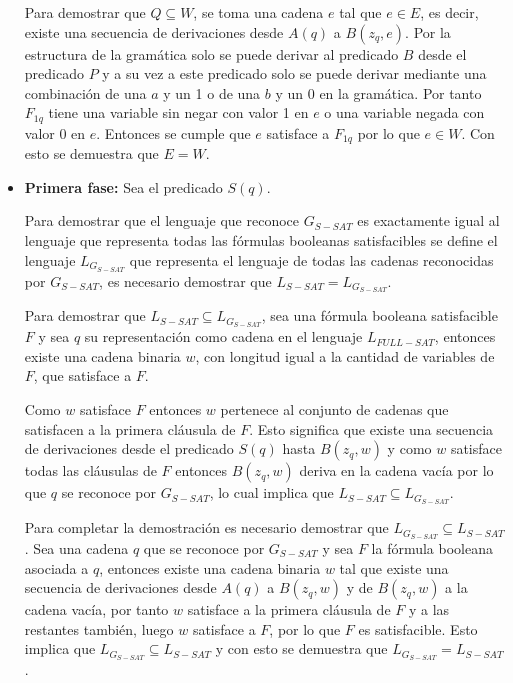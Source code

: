 \begin{itemize}
          Para demostrar que $Q\subseteq W$, se toma una cadena $e$ tal que $e\in E$, es decir, existe una
          secuencia de derivaciones desde $A(q)$ a $B(z_q,e)$. Por la estructura de la gramática solo se
          puede derivar al predicado $B$ desde el predicado $P$ y a su vez a este predicado solo se puede
          derivar mediante una combinación de una $a$ y un 1 o de una $b$ y un 0 en la gramática. Por tanto
          $F_{1q}$ tiene una variable sin negar con valor 1 en $e$ o una variable negada con valor 0 en $e$.
          Entonces se cumple que $e$ satisface a $F_{1q}$ por lo que $e\in W$. Con esto se demuestra que $E=W$.

    \item \textbf{Primera fase:} Sea el predicado $S(q)$.

          Para demostrar que el lenguaje que reconoce $G_{S-SAT}$ es exactamente igual al lenguaje que
          representa todas las fórmulas booleanas satisfacibles se define el lenguaje $L_{G_{S-SAT}}$
          que representa el lenguaje de todas las cadenas reconocidas por $G_{S-SAT}$, es necesario
          demostrar que $L_{S-SAT}=L_{G_{S-SAT}}$.

          Para demostrar que $L_{S-SAT}\subseteq L_{G_{S-SAT}}$, sea una fórmula booleana satisfacible $F$ y sea $q$ su representación como cadena en el lenguaje $L_{FULL-SAT}$,
          entonces existe una cadena binaria $w$, con longitud igual a la cantidad de variables de $F$, que satisface
          a $F$.

          Como $w$ satisface $F$ entonces $w$ pertenece al conjunto de cadenas que satisfacen a la primera
          cláusula de $F$. Esto significa que existe una secuencia de derivaciones desde el predicado $S(q)$
          hasta $B(z_q,w)$ y como $w$ satisface todas las cláusulas de $F$ entonces $B(z_q,w)$ deriva en la
          cadena vacía por lo que $q$ se reconoce por $G_{S-SAT}$, lo cual implica que $L_{S-SAT}\subseteq L_{G_{S-SAT}}$.

          Para completar la demostración es necesario demostrar que $ L_{G_{S-SAT}}\subseteq L_{S-SAT}$. Sea una cadena
          $q$ que se reconoce por $G_{S-SAT}$ y sea $F$ la fórmula booleana asociada a $q$, entonces existe una cadena
          binaria $w$ tal que existe una secuencia de derivaciones desde $A(q)$ a $B(z_q,w)$ y de $B(z_q,w)$ a la cadena vacía,
          por tanto $w$ satisface a la primera cláusula de $F$ y a las restantes también, luego $w$ satisface a $F$,
          por lo que $F$ es satisfacible. Esto implica que $L_{G_{S-SAT}}\subseteq L_{S-SAT}$ y con esto se demuestra que
          $L_{G_{S-SAT}}= L_{S-SAT}$.

\end{itemize}

